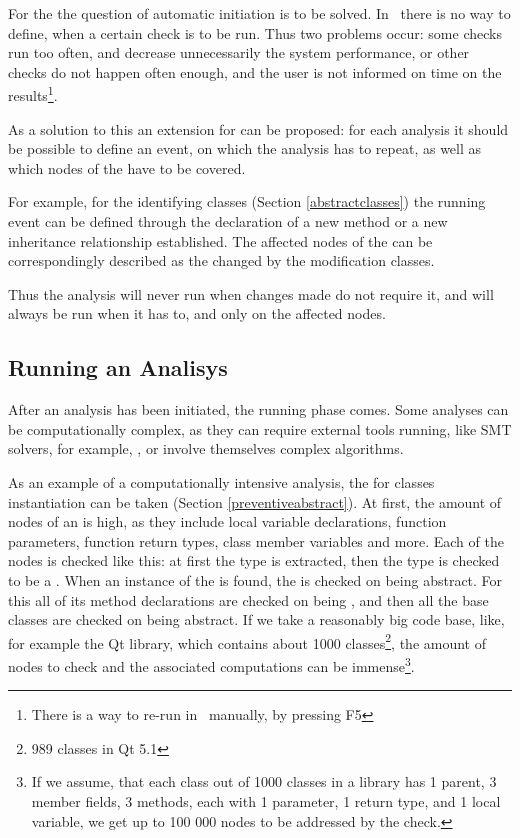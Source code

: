 For the  the question of automatic initiation is to be solved. In \jbmps\ there is no 
way to define, when a certain check is to be run. Thus two problems occur: some checks run too often, and 
decrease unnecessarily the system performance, or other checks do not happen often enough, and the user is not 
informed on time on the results\footnote{There is a way to re-run  in \jbmps\ manually,
by pressing F5}. 

As a solution to this an  extension for can be proposed: for each analysis it should be possible 
to define an event, on which the analysis has to repeat, as well as which nodes of the  have to be covered.

For example, for the  identifying  classes (Section \ref{abstractclasses}) the running
event can be defined through the declaration of a new method or a new inheritance relationship established. The 
affected nodes of the  can be correspondingly described as the changed by the modification classes.

Thus the analysis will never run when changes made do not require it, and will always be run when 
it has to, and only on the affected nodes.


\subsection{Running an Analisys}

After an analysis has been initiated, the running phase comes. Some analyses can be computationally complex,
as they can require external tools running, like SMT solvers, for example, \cite{2012_ratiu_modular_dsls_and_analyses},
or involve themselves complex algorithms.


As an example of a computationally intensive analysis, the  for  classes 
instantiation can be taken (Section \ref{preventiveabstract}). At first, the amount of nodes of an  is high,
as they include local variable declarations, function parameters, function return types, class member variables
and more. Each of the nodes is checked like this: at first the type is extracted, then the type is checked to be 
a . When an instance of the  is found, the  is checked on being abstract.
For this all of its method declarations are checked on being , and then all the base classes are 
checked on being abstract. If we take a reasonably big code base, like, for example the Qt library, which contains about 1000
classes\footnote{989 classes in Qt 5.1}, the amount of nodes to check and the associated computations can be immense\footnote{If we assume,
that each class out of 1000 classes in a library has 1 parent, 3 member fields, 3 methods, each with 1 parameter, 1 return type, and 1 local variable,
we get up to 100 000 nodes to be addressed by the check.}.

